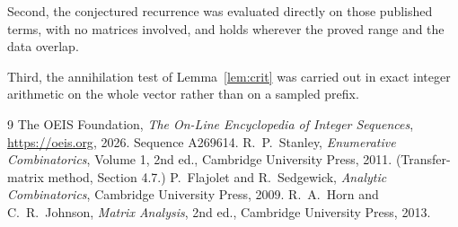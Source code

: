 \documentclass[11pt,a4paper]{article}
\theoremstyle{plain}
\theoremstyle{definition}
\begin{document}
Second, the conjectured recurrence was evaluated directly on those published terms, with no
matrices involved, and holds wherever the proved range and the data overlap.

Third, the annihilation test of Lemma~\ref{lem:crit} was carried out in exact integer
arithmetic on the whole vector rather than on a sampled prefix.

\begin{thebibliography}{9}
 The OEIS Foundation, \emph{The On-Line Encyclopedia of Integer
Sequences}, \url{https://oeis.org}, 2026. Sequence A269614.
 R.~P.~Stanley, \emph{Enumerative Combinatorics}, Volume 1, 2nd ed.,
Cambridge University Press, 2011. (Transfer-matrix method, Section 4.7.)
 P.~Flajolet and R.~Sedgewick, \emph{Analytic Combinatorics}, Cambridge
University Press, 2009.
 R.~A.~Horn and C.~R.~Johnson, \emph{Matrix Analysis}, 2nd ed., Cambridge
University Press, 2013.
\end{thebibliography}
\end{document}

